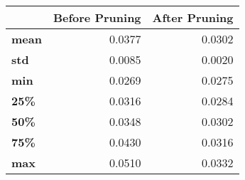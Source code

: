 \begin{tabular}{lrr}
\toprule
{} &  Before Pruning &  After Pruning \\
\midrule
\textbf{mean} &          0.0377 &         0.0302 \\
\textbf{std } &          0.0085 &         0.0020 \\
\textbf{min } &          0.0269 &         0.0275 \\
\textbf{25\% } &          0.0316 &         0.0284 \\
\textbf{50\% } &          0.0348 &         0.0302 \\
\textbf{75\% } &          0.0430 &         0.0316 \\
\textbf{max } &          0.0510 &         0.0332 \\
\bottomrule
\end{tabular}
